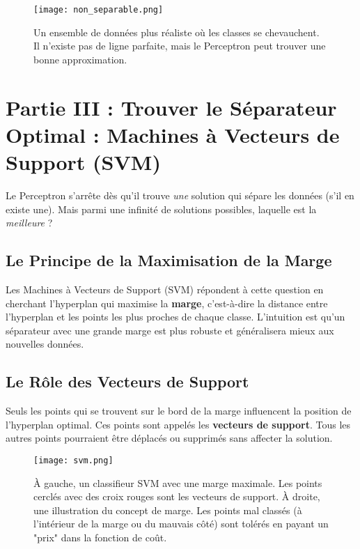 \documentclass[12pt]{article}
\begin{document}
\begin{figure}[h!]
    \centering
    \texttt{[image: non\_separable.png]}
    \caption{Un ensemble de données plus réaliste où les classes se chevauchent. Il n'existe pas de ligne parfaite, mais le Perceptron peut trouver une bonne approximation.}
    \label{fig:non_separable}
\end{figure}

\newpage
\section{Partie III : Trouver le Séparateur Optimal : Machines à Vecteurs de Support (SVM)}
Le Perceptron s'arrête dès qu'il trouve \textit{une} solution qui sépare les données (s'il en existe une). Mais parmi une infinité de solutions possibles, laquelle est la \textit{meilleure} ?

\subsection{Le Principe de la Maximisation de la Marge}
Les Machines à Vecteurs de Support (SVM) répondent à cette question en cherchant l'hyperplan qui maximise la \textbf{marge}, c'est-à-dire la distance entre l'hyperplan et les points les plus proches de chaque classe. L'intuition est qu'un séparateur avec une grande marge est plus robuste et généralisera mieux aux nouvelles données.

\subsection{Le Rôle des Vecteurs de Support}
Seuls les points qui se trouvent sur le bord de la marge influencent la position de l'hyperplan optimal. Ces points sont appelés les \textbf{vecteurs de support}. Tous les autres points pourraient être déplacés ou supprimés sans affecter la solution.

\begin{figure}[h!]
    \centering
    \texttt{[image: svm.png]}
    \caption{À gauche, un classifieur SVM avec une marge maximale. Les points cerclés avec des croix rouges sont les vecteurs de support. À droite, une illustration du concept de marge. Les points mal classés (à l'intérieur de la marge ou du mauvais côté) sont tolérés en payant un "prix" dans la fonction de coût.}
    \label{fig:svm}
\end{figure}
\end{document}
